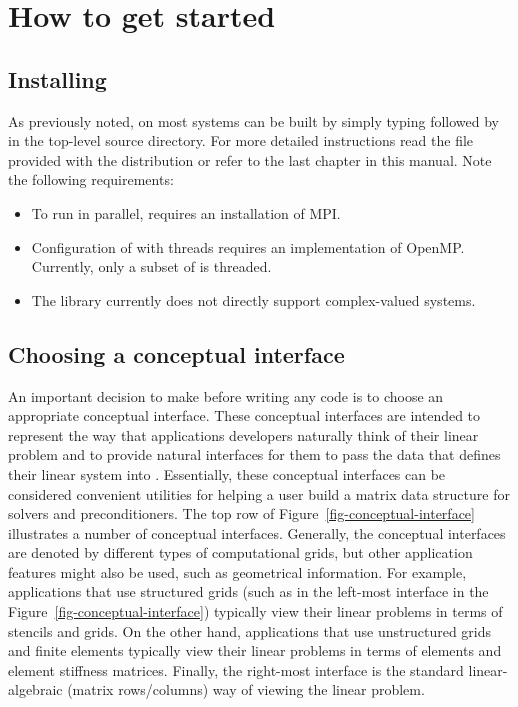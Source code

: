 
\section{How to get started}

\subsection{Installing \hypre{}}

As previously noted, on most systems \hypre{} can be built by simply typing
 followed by  in the top-level source directory. For
more detailed instructions read the  file provided with the
\hypre{} distribution or refer to the last chapter in this manual. Note the
following requirements:

\begin{itemize}

\item To run in parallel, \hypre{} requires an installation of MPI.

\item Configuration of \hypre{} with threads requires an implementation
of OpenMP.  Currently, only a subset of \hypre{} is threaded.

\item The \hypre{} library currently does not directly support complex-valued
systems.

\end{itemize}

\subsection{Choosing a conceptual interface}

An important decision to make before writing any code is to choose an
appropriate conceptual interface.  These conceptual interfaces are
intended to represent the way that applications developers naturally
think of their linear problem and to provide natural interfaces for them
to pass the data that defines their linear system into \hypre{}.
Essentially, these conceptual interfaces can be considered convenient
utilities for helping a user build a matrix data structure for
\hypre{} solvers and preconditioners.  The top row of
Figure~\ref{fig-conceptual-interface} illustrates a number of
conceptual interfaces.  Generally, the conceptual interfaces are
denoted by different types of computational grids, but other
application features might also be used, such as geometrical
information.  For example, applications that use structured grids
(such as in the left-most interface in the
Figure~\ref{fig-conceptual-interface}) typically view their linear
problems in terms of stencils and grids.  On the other hand,
applications that use unstructured grids and finite elements typically
view their linear problems in terms of elements and element stiffness
matrices. Finally, the right-most interface is the standard
linear-algebraic (matrix rows/columns) way of viewing the linear
problem.

